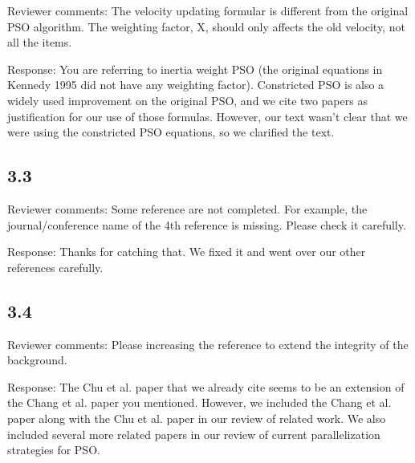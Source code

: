 \documentclass[onecolumn, 12pt]{article}
\begin{document}
Reviewer comments: The velocity updating formular is different from the
original PSO algorithm.  The weighting factor, X, should only affects the old
velocity, not all the items.

Response: You are referring to inertia weight PSO (the original equations in
Kennedy 1995 did not have any weighting factor).  Constricted PSO is also a
widely used improvement on the original PSO, and we cite two papers as
justification for our use of those formulas.  However, our text wasn't clear
that we were using the constricted PSO equations, so we clarified the text.

\subsection*{3.3}

Reviewer comments: Some reference are not completed. For example, the
journal/conference name of the 4th reference is missing. Please check it
carefully.

Response: Thanks for catching that.  We fixed it and went over our other
references carefully.

\subsection*{3.4}

Reviewer comments: Please increasing the reference to extend the integrity of
the background.

Response: The Chu et al. paper that we already cite seems to be an extension of
the Chang et al. paper you mentioned.  However, we included the Chang et al.
paper along with the Chu et al. paper in our review of related work.  We also
included several more related papers in our review of current parallelization
strategies for PSO.
\end{document}
